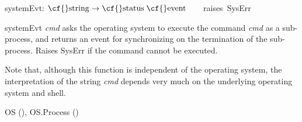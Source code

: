 \begin{descr}
\item {}{} {\cf systemEvt: \(\mbox{\cf{}string}\rightarrow \mbox{\cf{}status}\;\mbox{\cf{}event}\)}\label{val-CML_OS_PROCESS.systemEvt}\linebreak[3]\hspace*{\fill}\mbox{~~~~\textrm{raises}~{\cf Sys\-Err}}


\begin{speccomment}
\item {\cf \small system\-Evt \mbox{\cf \small \textit{cmd}}           } 
asks the operating system to execute the command \mbox{\cf \small \textit{cmd}} as 	  a sub-process, and returns an event for synchronizing on the 	  termination of the sub-process.           Raises {\cf \small Sys\-Err} if the command cannot be executed.           

          Note that, although this function is independent of the operating           system, the interpretation of the string \mbox{\cf \small \textit{cmd}} depends           very much on the underlying operating system and shell.\end{speccomment}
\end{descr}

\begin{seealso}
{\cf OS} (\pageref{str-OS}), {\cf OS.\-Process} (\pageref{str-CML_OS.Process})
\end{seealso}
